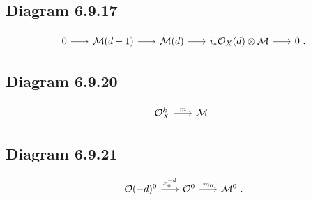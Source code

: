 \documentclass[leqno]{amsart}
\begin{document}
	\subsection*{Diagram 6.9.17}

	\begin{equation*}
		\begin{tikzcd}[sep=scriptsize]
			0 \arrow{r} & \mathcal{M}(d-1) \arrow{r} & \mathcal{M}(d) \arrow{r} & i_{\ast} \mathcal{O}_{X}(d) \otimes \mathcal{M} \arrow{r} & 0 \rlap{\  .}
		\end{tikzcd}
	\end{equation*}

	\subsection*{Diagram 6.9.20}

	\begin{equation*}
		\begin{tikzcd}[sep=scriptsize]
			\mathcal{O}_{X}^{k} \arrow{r}{m} & \mathcal{M}
		\end{tikzcd}
	\end{equation*}

	\subsection*{Diagram 6.9.21}

	\begin{equation*}
		\begin{tikzcd}[sep=scriptsize]
			\mathcal{O}(-d)^{0} \arrow{r}{x_{0}^{-d}} & \mathcal{O}^0 \arrow{r}{m_{0}} &  \mathcal{M}^0 \rlap{\  .}
		\end{tikzcd}
	\end{equation*}
\end{document}
